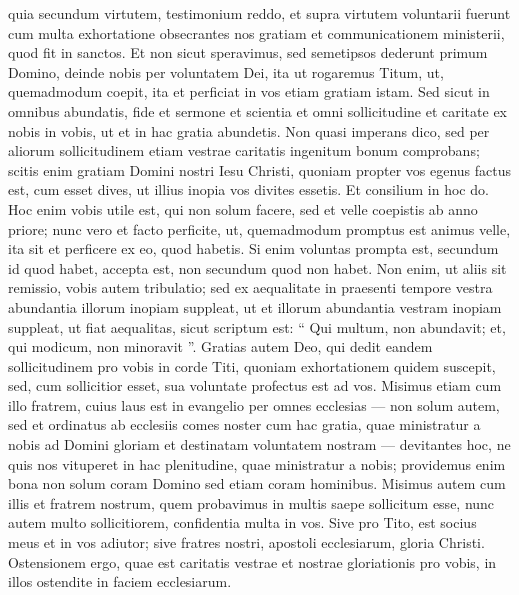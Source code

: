 \begin{biblechapter}
\begin{biblechapter}
\begin{biblechapter}
\begin{biblechapter}
\begin{biblechapter}
\begin{biblechapter}
\begin{biblechapter}
\begin{biblechapter}
\verse quia secundum virtutem, testimonium reddo, et supra virtutem voluntarii fuerunt 
\verse cum multa exhortatione obsecrantes nos gratiam et communicationem ministerii, quod fit in sanctos. 
\verse Et non sicut speravimus, sed semetipsos dederunt primum Domino, deinde nobis per voluntatem Dei, 
\verse ita ut rogaremus Titum, ut, quemadmodum coepit, ita et perficiat in vos etiam gratiam istam.
 \verse Sed sicut in omnibus abundatis, fide et sermone et scientia et omni sollicitudine et caritate ex nobis in vobis, ut et in hac gratia abundetis. 
 \verse Non quasi imperans dico, sed per aliorum sollicitudinem etiam vestrae caritatis ingenitum bonum comprobans; 
\verse scitis enim gratiam Domini nostri Iesu Christi, quoniam propter vos egenus factus est, cum esset dives, ut illius inopia vos divites essetis. 
\verse Et consilium in hoc do. Hoc enim vobis utile est, qui non solum facere, sed et velle coepistis ab anno priore; 
\verse nunc vero et facto perficite, ut, quemadmodum promptus est animus velle, ita sit et perficere ex eo, quod habetis. 
\verse Si enim voluntas prompta est, secundum id quod habet, accepta est, non secundum quod non habet. 
\verse Non enim, ut aliis sit remissio, vobis autem tribulatio; sed ex aequalitate 
\verse in praesenti tempore vestra abundantia illorum inopiam suppleat, ut et illorum abundantia vestram inopiam suppleat, ut fiat aequalitas, sicut scriptum est: 
\verse “ Qui multum, non abundavit; et, qui modicum, non minoravit ”.
 \verse Gratias autem Deo, qui dedit eandem sollicitudinem pro vobis in corde Titi, 
\verse quoniam exhortationem quidem suscepit, sed, cum sollicitior esset, sua voluntate profectus est ad vos. 
\verse Misimus etiam cum illo fratrem, cuius laus est in evangelio per omnes ecclesias 
\verse — non solum autem, sed et ordinatus ab ecclesiis comes noster cum hac gratia, quae ministratur a nobis ad Domini gloriam et destinatam voluntatem nostram — 
\verse devitantes hoc, ne quis nos vituperet in hac plenitudine, quae ministratur a nobis; 
\verse providemus enim bona non solum coram Domino sed etiam coram hominibus. 
\verse Misimus autem cum illis et fratrem nostrum, quem probavimus in multis saepe sollicitum esse, nunc autem multo sollicitiorem, confidentia multa in vos.
 \verse Sive pro Tito, est socius meus et in vos adiutor; sive fratres nostri, apostoli ecclesiarum, gloria Christi. 
\verse Ostensionem ergo, quae est caritatis vestrae et nostrae gloriationis pro vobis, in illos ostendite in faciem ecclesiarum.
 

\end{biblechapter}
\end{biblechapter}
\end{biblechapter}
\end{biblechapter}
\end{biblechapter}
\end{biblechapter}
\end{biblechapter}
\end{biblechapter}
